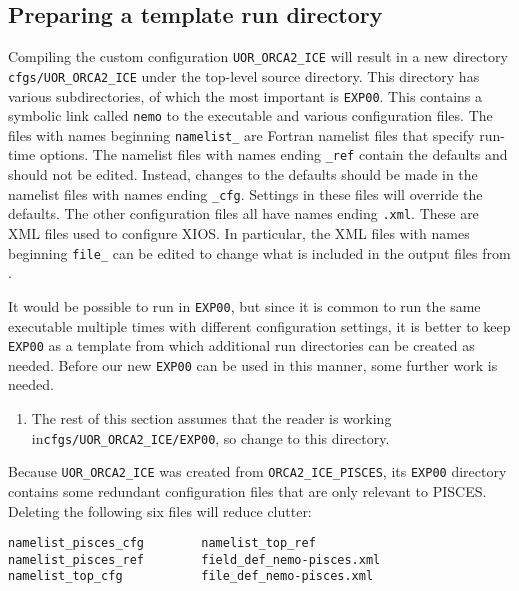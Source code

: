 \subsection{Preparing a template run directory}
\label{sec:tutorial:subsec:run-directory}

Compiling the custom configuration \verb|UOR_ORCA2_ICE| will result in a new directory \verb|cfgs/UOR_ORCA2_ICE| under the top-level source directory.
This directory has various subdirectories, of which the most important is \verb|EXP00|.
This contains a symbolic link called \verb|nemo| to the \NEMOSIcu{} executable and various configuration files.
The files with names beginning \verb|namelist_| are Fortran namelist files that specify run-time options.
The namelist files with names ending \verb|_ref| contain the defaults and should not be edited.
Instead, changes to the defaults should be made in the namelist files with names ending \verb|_cfg|.
Settings in these files will override the defaults.
The other configuration files all have names ending \verb|.xml|.
These are XML files used to configure XIOS.
In particular, the XML files with names beginning \verb|file_| can be edited to change what is included in the output files from \NEMOSIcu{}.

It would be possible to run \NEMOSIcu{} in \verb|EXP00|, but since it is common to run the same executable multiple times with different configuration settings, it is better to keep \verb|EXP00| as a template from which additional run directories can be created as needed.
Before our new \verb|EXP00| can be used in this manner, some further work is needed.

\begin{enumerate}
    \item The rest of this section assumes that the reader is working in\newline\verb|cfgs/UOR_ORCA2_ICE/EXP00|, so change to this directory.
\end{enumerate}

Because \verb|UOR_ORCA2_ICE| was created from \verb|ORCA2_ICE_PISCES|, its \verb|EXP00| directory contains some redundant configuration files that are only relevant to PISCES.
Deleting the following six files will reduce clutter:

\begin{verbatim}
namelist_pisces_cfg        namelist_top_ref
namelist_pisces_ref        field_def_nemo-pisces.xml
namelist_top_cfg           file_def_nemo-pisces.xml
\end{verbatim}

